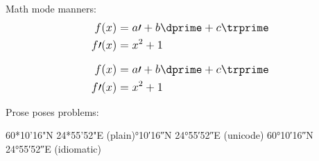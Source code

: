 \documentclass{article}
\begin{document}
\fontsize{12}{16}
\selectfont

Math mode manners:
\[\mathlarger{\begin{aligned}
	f(x) & = a\prime + b\dprime + c\trprime \\
	f\prime(x) & = x^{2} + 1
\end{aligned}}\]

\[\mathlarger{\begin{aligned}
	f(x) & = a\prime + b\dprime + c\trprime \\
	f\prime(x) & = x^{2} + 1
\end{aligned}}\]

Prose poses problems:
\smallskip

\raggedright{
	60*10'16"N 24*55'52"E (plain)°10′16″N 24°55′52″E (unicode)\break
	\ang{60;10;16}N \ang{24;55;52}E (idiomatic)
}
\end{document}
